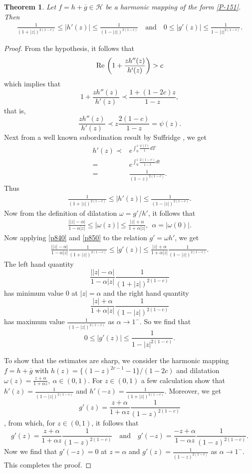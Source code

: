 \documentclass[a4paper,12pt]{amsart}
\newtheorem{thm}{Theorem}[section]
\theoremstyle{definition}
\newcounter {own}
\begin{document}
	\begin{thm}\label{p870}
		Let $f=h+\overline{g}\in\mathcal{H}$ be a harmonic mapping of the form \eqref{P-151}. Then
		\begin{align*}
		\frac{1}{(1+|z|)^{2(1-c)}}\le |h'(z)|\le \frac{1}{(1-|z|)^{2(1-c)}}\quad\text{and}\quad 0\le |g'(z)|\le\frac{1}{1-|z|^{2(1-c)}}.
		\end{align*}
	\end{thm}
\begin{proof}
From the hypothesis, it follows that
$${\rm Re\,}\left(1+\frac{zh''(z)}{h'(z)}\right)> c$$ which implies that 
$$1+\frac{zh''(z)}{h'(z)}\prec\frac{1+(1-2c)z}{1-z},$$ that is, $$\frac{zh''(z)}{h'(z)}\prec z\frac{2(1-c)}{1-z}=\psi(z).$$
Next from a well known subordination result by Suffridge \cite{Suffridge-1970}, we get
\begin{align*}
h'(z)\prec &  e^{\int_{0}^{z}\frac{\psi(t)}{t}dT}\\\nonumber
  =& e^{\int_{0}^{z}\frac{2(1-c)}{1-t}dt}\\\nonumber
  = & \frac{1}{(1-z)^{2(1-c)}}.
\end{align*}
Thus
\begin{align}\label{p840}
	\frac{1}{(1+|z|)^{2(1-c)}}\le |h'(z)|\le \frac{1}{(1-|z|)^{2(1-c)}}.
	\end{align}
Now from the definition of dilatation $\omega=g'/h'$, it follows that 
\begin{align}\label{p850}
	\frac{\left||z|-\alpha\right|}{1-\alpha|z|}\le\left|\omega(z)\right|\le\frac{|z|+\alpha}{1+\alpha|z|},~~\alpha=|\omega(0)|.
\end{align}
Now applying \eqref{p840} and \eqref{p850} to the relation $g'=\omega h'$, we get
\begin{align*}
	\frac{\left||z|-\alpha\right|}{1-\alpha|z|}\frac{1}{(1+|z|)^{2(1-c)}}\le |g'(z)|\le \frac{|z|+\alpha}{1+\alpha|z|}\frac{1}{(1-|z|)^{2(1-c)}}.
\end{align*}
The left hand quantity $$\frac{\left||z|-\alpha\right|}{1-\alpha|z|}\frac{1}{(1+|z|)^{2(1-c)}}$$ has minimum value $0$ at $|z|=\alpha$ and the right hand quantity $$\frac{|z|+\alpha}{1+\alpha|z|}\frac{1}{(1-|z|)^{2(1-c)}}$$ has maximum value $\frac{1}{(1-|z|)^{2(1-c)}}$ as $\alpha\rightarrow 1^-.$ So we find that
$$0\le |g'(z)|\le\frac{1}{1-|z|^{2(1-c)}}.$$

To show that the estimates are sharp, we consider the harmonic mapping $f=h+\overline{g}$ with $h(z)=\{(1-z)^{2c-1}-1\}/(1-2c)$ and dilatation $\omega(z)=\frac{z+\alpha}{1+\alpha z},~\alpha\in(0,1).$ 
For $z\in(0,1)$ a few calculation show that
$h'(z)=\frac{1}{(1-|z|)^{2(1-c)}}$ and $h'(-z)=\frac{1}{(1+|z|)^{2(1-c)}}.$ Moreover, we get
$$g'(z)=\frac{z+\alpha}{1+\alpha z}\frac{1}{(1-z)^{2(1-c)}}$$, from which, for $z\in(0,1)$, it follows that 
$$g'(z)=\frac{z+\alpha}{1+\alpha z}\frac{1}{(1-z)^{2(1-c)}}\quad\text{and}\quad g'(-z)=\frac{-z+\alpha}{1-\alpha z}\frac{1}{(1-z)^{2(1-c)}}.$$
Now we  find that $g'(-z)=0$ at $z=\alpha$ and $g'(z)=\frac{1}{(1-z)^{2(1-c)}}$ as $\alpha\rightarrow 1^-$. This completes the proof.
\end{proof}
\end{document}
